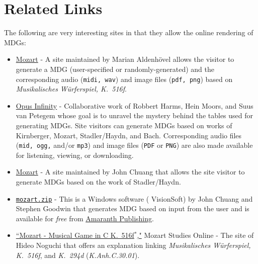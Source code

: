 \documentclass[letterpaper,x11names,svgnames,10pt]{article}
\begin{document}
\section{Related Links}
The following are very interesting sites in that they allow the online rendering of MDGs:
\begin{itemize}
	\item  \href{https://marian-aldenhoevel.de/mozart/}{Mozart} - A site maintained by Marian Aldenh\"{o}vel allows the visitor to generate a MDG (user-specified or randomly-generated) and the corresponding audio ({\tt midi, wav}) and image files ({\tt pdf, png}) based on {\em Musikalisches W\"{u}rferspiel, K.\ 516f}.
	
	\item \href{https://opus-infinity.org}{Opus Infinity} - Collaborative work of Robbert Harms, Hein Moors, and Suus van Petegem whose goal is to unravel the mystery behind the tables used for generating MDGs.  Site visitors can generate MDGs based on works of Kirnberger, Mozart, Stadler/Haydn, and Bach.  Corresponding audio files ({\tt mid, ogg,} and/or {\tt mp3}) and image files ({\tt PDF} or {\tt PNG}) are also made available for listening, viewing, or downloading.
	
	\item  \href{http://sunsite.univie.ac.at/Mozart/dice/}{Mozart} - A site maintained by John Chuang that allows the site visitor to generate MDGs based on the work of Stadler/Haydn.
 	
 	\item \href{https://www.amaranthpublishing.com/mozart.zip}{\tt mozart.zip} -  This is a Windows software ( VisionSoft) by John Chuang and Stephen Goodwin that generates MDG based on input from the user and is available for {\it free} from  \href{http://www.amaranthpublishing.com/MozartDiceGame.htm}{Amaranth Publishing}.  
 	
 	\item \href{http://www.asahi-net.or.jp/\~rb5h-ngc/e/k516f.htm}{``Mozart - Musical Game in C K.\ 516f$^*$,"}	Mozart Studies Online - The site of Hideo Noguchi that offers an explanation linking {\em Musikalisches W\"{u}rferspiel, K.\ 516f}, and  {\em K.\ 294d} ({\em K.Anh.C.30.01}). 
\end{itemize}
\end{document}
